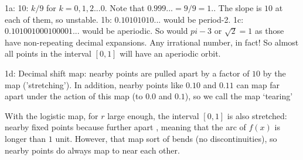 \documentclass[12pt,letterpaper,noanswers]{exam}
\begin{document}
\begin{questions}
\end{questions}

1a: 10: $k/9$ for $k=0,1,2...0$.  Note that $0.999... = 9/9 = 1.$.  The slope is $10$ at each of them, so unstable.
1b: $0.10101010...$ would be period-2.
1c: $0.101001000100001...$ would be aperiodic.  So would $pi -3$ or $\sqrt{2} = 1$ as those have non-repeating decimal expansions.  Any irrational number, in fact!  So almost all points in the interval $[0,1]$ will have an aperiodic orbit.

1d: Decimal shift map: nearby points are pulled apart by a factor of $10$ by the map ('stretching').  In addition, nearby points like $0.10$ and $0.11$ can map far apart under the action of this map (to $0.0$ and $0.1$), so we call the map `tearing'

With the logistic map, for $r$ large enough, the interval $[0,1]$ is also stretched: nearby fixed points because further apart , meaning that the arc of $f(x)$ is longer than $1$ unit.  However, that map sort of bends (no discontinuities), so nearby points do always map to near each other.
\end{document}
